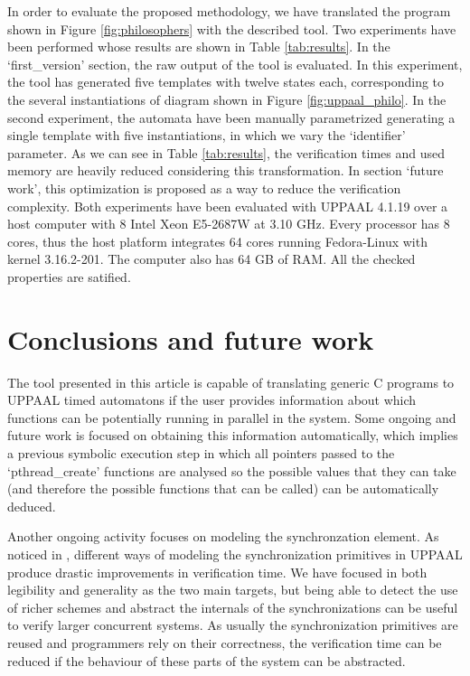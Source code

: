 \documentclass[conference]{IEEEtran}
\begin{document}
In order to evaluate the proposed methodology, we have translated the program shown in Figure \ref{fig:philosophers} with the described tool. Two experiments have been performed whose results are shown in Table \ref{tab:results}. In the `first\_version' section, the raw output of the tool is evaluated. In this experiment, the tool has generated five templates with twelve states each, corresponding to the several instantiations of diagram shown in Figure \ref{fig:uppaal_philo}. In the second experiment, the automata have been manually parametrized generating a single template with five instantiations, in which we vary the `identifier' parameter. As we can see in Table \ref{tab:results}, the verification times and used memory are heavily reduced considering this transformation. In section `future work', this optimization is proposed as a way to reduce the verification complexity. Both experiments have been evaluated with UPPAAL 4.1.19 over a host computer with 8 Intel Xeon E5-2687W at 3.10 GHz. Every processor has 8 cores, thus the host platform integrates 64 cores running Fedora-Linux with kernel 3.16.2-201. The computer also has 64 GB of RAM. All the checked properties are satified. 



\section{Conclusions and future work}

The tool presented in this article is capable of translating generic C programs to UPPAAL timed automatons if the user provides information about which functions can be potentially running in parallel in the system. Some ongoing and future work is focused on obtaining this information automatically, which implies a previous symbolic execution step in which all pointers passed to the `pthread\_create' functions are analysed so the possible values that they can take (and therefore the possible functions that can be called) can be automatically deduced.

Another ongoing activity focuses on modeling the synchronzation element. As noticed in \cite{cicirelli2011}, different ways of modeling the synchronization primitives in UPPAAL produce drastic improvements in verification time. We have focused in both legibility and generality as the two main targets, but being able to detect the use of richer schemes and abstract the internals of the synchronizations can be useful to verify larger concurrent systems. As usually the synchronization primitives are reused and programmers rely on their correctness, the verification time can be reduced if the behaviour of these parts of the system can be abstracted.
\end{document}
